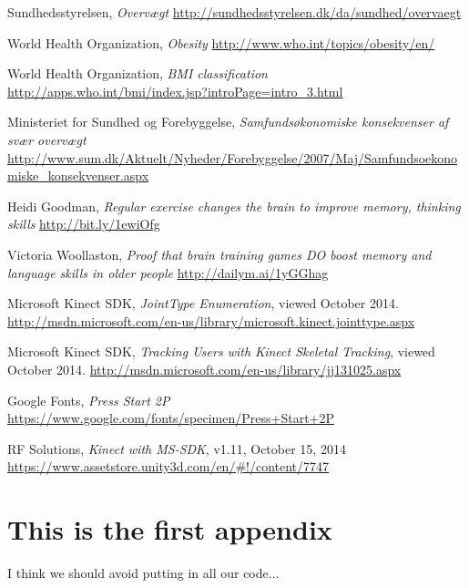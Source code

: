 \documentclass[11pt]{report}
\begin{document}
\begin{thebibliography}{99}
  Sundhedsstyrelsen,
  \emph{Overv\ae gt}
  \url{http://sundhedsstyrelsen.dk/da/sundhed/overvaegt}

	World Health Organization,
	\emph{Obesity}
	\url{http://www.who.int/topics/obesity/en/}
	
	World Health Organization,
	\emph{BMI classification}
	\url{http://apps.who.int/bmi/index.jsp?introPage=intro_3.html}

	Ministeriet for Sundhed og Forebyggelse,
	\emph{Samfunds\o konomiske konsekvenser af sv\ae r overv\ae gt}
	\url{http://www.sum.dk/Aktuelt/Nyheder/Forebyggelse/2007/Maj/Samfundsoekonomiske_konsekvenser.aspx}

	Heidi Goodman, \emph{Regular exercise changes the brain to improve memory, thinking skills}
	\url{http://bit.ly/1ewiOfg}
	
	Victoria Woollaston, \emph{Proof that brain training games DO boost memory and language skills in older people}
	\url{http://dailym.ai/1yGGhag}

	Microsoft Kinect SDK, \emph{JointType Enumeration}, viewed October 2014.
	\url{http://msdn.microsoft.com/en-us/library/microsoft.kinect.jointtype.aspx}

	Microsoft Kinect SDK, \emph{Tracking Users with Kinect Skeletal Tracking}, viewed October 2014.
	\url{http://msdn.microsoft.com/en-us/library/jj131025.aspx}

	Google Fonts, \emph{Press Start 2P}
	\url{https://www.google.com/fonts/specimen/Press+Start+2P}
	
	RF Solutions, \emph{Kinect with MS-SDK}, v1.11, October 15, 2014
	\url{https://www.assetstore.unity3d.com/en/#!/content/7747}

	

	

	


\end{thebibliography}


\appendix

\chapter{This is the first appendix}
I think we should avoid putting in all our code...
\end{document}
